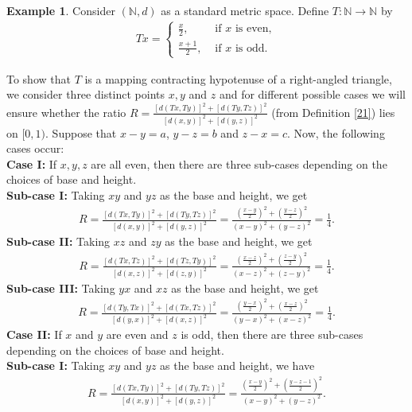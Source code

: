 \documentclass[11pt,reqno,a4paper]{amsart}
\theoremstyle{plain}
\theoremstyle{definition}
\newtheorem{example}[theorem]{Example}
\theoremstyle{remark}
\numberwithin{equation}{section}
\begin{document}
\begin{example}\label{27}
Consider $(\mathbb{N},d)$ as a standard metric space. Define $T:\mathbb{N}\to \mathbb{N}$ by
\begin{align*}
Tx=   
\begin{cases}
    \frac{x}{2}, &\text{ if $x$ is even},\\
    \frac{x+1}{2}, &\text{ if $x$ is odd}. 
\end{cases}
\end{align*}

To show that $T$ is a mapping contracting hypotenuse of a right-angled triangle, we consider three distinct points $x,y$ and $z$ and for different possible cases we will ensure whether the ratio $R=\frac{[d(Tx,Ty)]^2 +[d(Ty,Tz)]^2}{[d(x,y)]^2 +[d(y,z)]^2}$ (from Definition \ref{21}) lies on $[0,1)$. Suppose that $x - y=a$, $y - z=b$ and $z - x=c$. Now, the following cases occur:\\
\textbf{Case I:} If $x,y,z$ are all even, then there are three sub-cases depending on the choices of base and height.\\
\textbf{Sub-case I:} Taking $xy$ and $yz$ as the base and height, we get 
 \begin{align}\label{2811}
    R=\frac{[d(Tx,Ty)]^2 +[d(Ty,Tz)]^2}{[d(x,y)]^2 +[d(y,z)]^2}
     =\frac{(\frac{x-y}{2})^2 +(\frac{y-z}{2})^2}{(x-y)^2 +(y-z)^2}
     =\frac{1}{4}.
\end{align}
\textbf{Sub-case II:} Taking $xz$ and $zy$ as the base and height, we get 
\begin{align}\label{2812}
    R=\frac{[d(Tx,Tz)]^2 +[d(Tz,Ty)]^2}{[d(x,z)]^2 +[d(z,y)]^2}
     =\frac{(\frac{x-z}{2})^2 +(\frac{z-y}{2})^2}{(x-z)^2 +(z-y)^2}
     =\frac{1}{4}.
\end{align}
\textbf{Sub-case III:} Taking $yx$ and $xz$ as the base and height, we get 
\begin{align}\label{2813}
    R=\frac{[d(Ty,Tx)]^2 +[d(Tx,Tz)]^2}{[d(y,x)]^2 +[d(x,z)]^2}
     =\frac{(\frac{y-x}{2})^2 +(\frac{x-z}{2})^2}{(y-x)^2 +(x-z)^2}
     =\frac{1}{4}.
\end{align}   
\textbf{Case II:} If $x$ and $y$ are even and $z$ is odd, then there are three sub-cases depending on the choices of base and height.\\
\textbf{Sub-case I:} Taking $xy$ and $yz$ as the base and height, we have
\begin{align*}
    R=\frac{[d(Tx,Ty)]^2 +[d(Ty,Tz)]^2}{[d(x,y)]^2 +[d(y,z)]^2}
     =\frac{(\frac{x-y}{2})^2 +(\frac{y-z-1}{2})^2}{(x-y)^2 +(y-z)^2}.

\end{align*}
\end{example}
\end{document}
